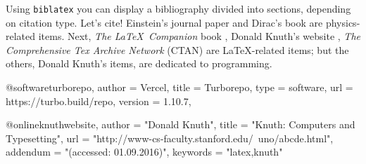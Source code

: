 

\maketitle

Using \texttt{biblatex} you can display a bibliography divided 
into sections, depending on citation type. Let's cite! Einstein's 
journal paper \cite{einstein} and Dirac's book \cite{dirac} are 
physics-related items. Next, \textit{The \LaTeX\ Companion} book
 \cite{latexcompanion}, Donald Knuth's website \cite{knuthwebsite},
\textit{The Comprehensive Tex Archive Network} (CTAN) 
\cite{ctan} are \LaTeX-related items; but the others, Donald Knuth's items, 
\cite{knuth-fa,knuth-acp} are dedicated to programming. 

\medskip

\printbibliography





@software{turborepo,
	author = {{Vercel}},
	title = {Turborepo},
	type = {software},
	url = {https://turbo.build/repo},
	version = {1.10.7},
}

@online{knuthwebsite,
    author = "Donald Knuth",
    title = "Knuth: Computers and Typesetting",
    url  = "http://www-cs-faculty.stanford.edu/~uno/abcde.html",
    addendum = "(accessed: 01.09.2016)",
    keywords = "latex,knuth"
}

